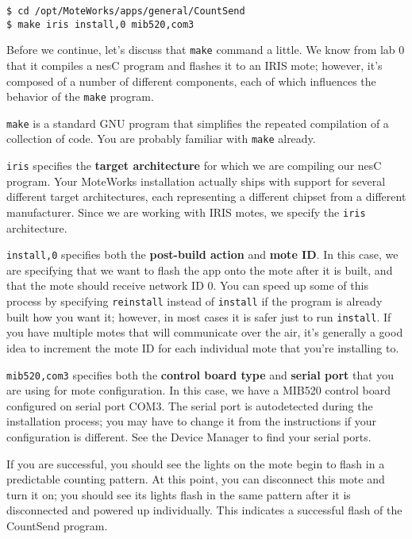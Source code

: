 \documentclass{article}
\begin{document}
\begin{verbatim}
$ cd /opt/MoteWorks/apps/general/CountSend
$ make iris install,0 mib520,com3
\end{verbatim}

Before we continue, let's discuss that \verb!make! command a little. We know from lab 0 that it compiles a nesC program and flashes it to an IRIS mote; however, it's composed of a number of different components, each of which influences the behavior of the \verb!make! program.

\begin{itemize*}
\item \verb!make! is a standard GNU program that simplifies the repeated compilation of a collection of code. You are probably familiar with \verb!make! already.
\item \verb!iris! specifies the \textbf{target architecture} for which we are compiling our nesC program. Your MoteWorks installation actually ships with support for several different target architectures, each representing a different chipset from a different manufacturer. Since we are working with IRIS motes, we specify the \verb!iris! architecture.
\item \verb!install,0! specifies both the \textbf{post-build action} and \textbf{mote ID}. In this case, we are specifying that we want to flash the app onto the mote after it is built, and that the mote should receive network ID 0. You can speed up some of this process by specifying \verb!reinstall! instead of \verb!install! if the program is already built how you want it; however, in most cases it is safer just to run \verb!install!. If you have multiple motes that will communicate over the air, it's generally a good idea to increment the mote ID for each individual mote that you're installing to.
\item \verb!mib520,com3! specifies both the \textbf{control board type} and \textbf{serial port} that you are using for mote configuration. In this case, we have a MIB520 control board configured on serial port COM3. The serial port is autodetected during the installation process; you may have to change it from the instructions if your configuration is different. See the Device Manager to find your serial ports.
\end{itemize*}

If you are successful, you should see the lights on the mote begin to flash in a predictable counting pattern. At this point, you can disconnect this mote and turn it on; you should see its lights flash in the same pattern after it is disconnected and powered up individually. This indicates a successful flash of the CountSend program.
\end{document}
